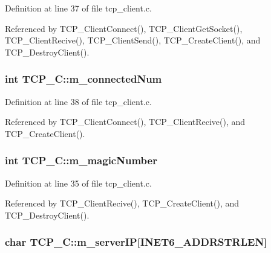 Definition at line 37 of file tcp\+\_\+client.\+c.



Referenced by T\+C\+P\+\_\+\+Client\+Connect(), T\+C\+P\+\_\+\+Client\+Get\+Socket(), T\+C\+P\+\_\+\+Client\+Recive(), T\+C\+P\+\_\+\+Client\+Send(), T\+C\+P\+\_\+\+Create\+Client(), and T\+C\+P\+\_\+\+Destroy\+Client().

\subsubsection[{\texorpdfstring{m\+\_\+connected\+Num}{m_connectedNum}}]{\setlength{\rightskip}{0pt plus 5cm}int T\+C\+P\+\_\+\+C\+::m\+\_\+connected\+Num}\hypertarget{structTCP__C_a07ecf4419608c6736a19537b2ee2c47d}{}\label{structTCP__C_a07ecf4419608c6736a19537b2ee2c47d}


Definition at line 38 of file tcp\+\_\+client.\+c.



Referenced by T\+C\+P\+\_\+\+Client\+Connect(), T\+C\+P\+\_\+\+Client\+Recive(), and T\+C\+P\+\_\+\+Create\+Client().

\subsubsection[{\texorpdfstring{m\+\_\+magic\+Number}{m_magicNumber}}]{\setlength{\rightskip}{0pt plus 5cm}int T\+C\+P\+\_\+\+C\+::m\+\_\+magic\+Number}\hypertarget{structTCP__C_adf0671722de576cd121c7bfc2e697684}{}\label{structTCP__C_adf0671722de576cd121c7bfc2e697684}


Definition at line 35 of file tcp\+\_\+client.\+c.



Referenced by T\+C\+P\+\_\+\+Client\+Recive(), T\+C\+P\+\_\+\+Create\+Client(), and T\+C\+P\+\_\+\+Destroy\+Client().

\subsubsection[{\texorpdfstring{m\+\_\+server\+IP}{m_serverIP}}]{\setlength{\rightskip}{0pt plus 5cm}char T\+C\+P\+\_\+\+C\+::m\+\_\+server\+IP\mbox{[}I\+N\+E\+T6\+\_\+\+A\+D\+D\+R\+S\+T\+R\+L\+EN\mbox{]}}\hypertarget{structTCP__C_abe2e28275eb3968d7939b58901d62d9d}{}\label{structTCP__C_abe2e28275eb3968d7939b58901d62d9d}


